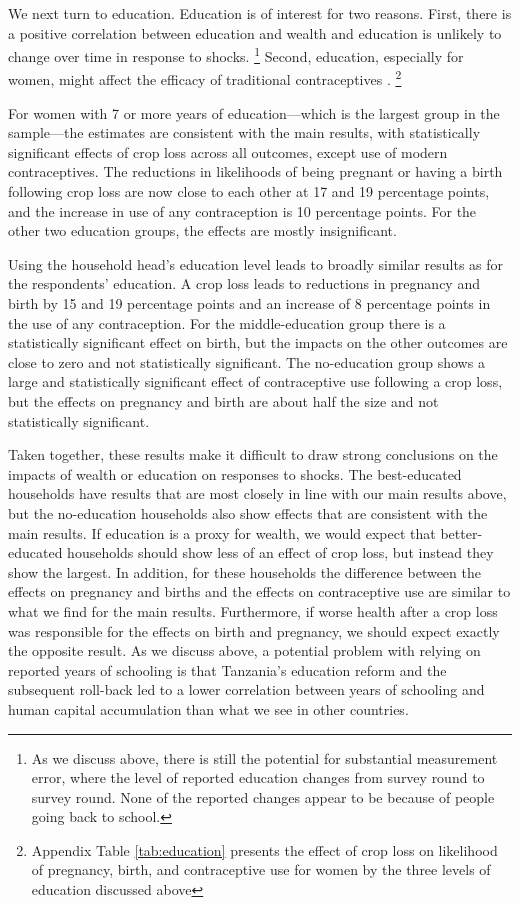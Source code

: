 \documentclass[letterpaper,12pt]{article}
\begin{document}
We next turn to education.
Education is of interest for two reasons.
First, there is a positive correlation between education and wealth and 
education is unlikely to change over time in response to shocks.%
\footnote{
As we discuss above, there is still the potential for substantial
measurement error, where the level of reported education changes
from survey round to survey round.
None of the reported changes appear to be because of people going 
back to school.
}
Second, education, especially for women, might affect the efficacy of 
traditional contraceptives \citep{Rosenzweig1989}.%
\footnote{
Appendix Table \ref{tab:education} presents the effect of crop loss on
likelihood of pregnancy, birth, and contraceptive use for women
by the three levels of education discussed above 
}

For women with 7 or more years of education---which is the largest
group in the sample---the estimates are consistent with the 
main results, with statistically significant effects of crop loss 
across all outcomes, except use of modern contraceptives.
The reductions in likelihoods of being pregnant or having a birth
following crop loss are now close to each other at 17 and 19 percentage
points, and the increase in use of any contraception is 10 percentage
points.
For the other two education groups, the effects are mostly insignificant.

Using the household head's education level leads to broadly 
similar results as for the respondents' education. 
A crop loss leads to reductions in pregnancy and birth by
15 and 19 percentage points and an increase of 8 percentage points
in the use of any contraception.
For the middle-education group there is a statistically significant
effect on birth, but the impacts on the other outcomes are close to zero and
not statistically significant.
The no-education group shows a large and statistically significant
effect of contraceptive use following a crop loss, but the
effects on pregnancy and birth are about half the size and
not statistically significant.

Taken together, these results make it difficult to draw strong
conclusions on the impacts of wealth or education on responses to shocks.
The best-educated households have results that are
most closely in line with our main results above, but 
the no-education households also show effects that are
consistent with the main results.
If education is a proxy for wealth, we would 
expect that better-educated households should show less
of an effect of crop loss, but instead they show the largest.
In addition, for these households the difference between
the effects on pregnancy and births and the effects on
contraceptive use are similar to what we find for the main results.
Furthermore, if worse health after a crop loss was responsible for the
effects on birth and pregnancy, we should expect exactly
the opposite result.
As we discuss above, a potential problem with relying on 
reported years of schooling is that Tanzania's education reform and the
subsequent roll-back led to a lower correlation between years of
schooling and human capital accumulation than what we see in other
countries.
\end{document}
